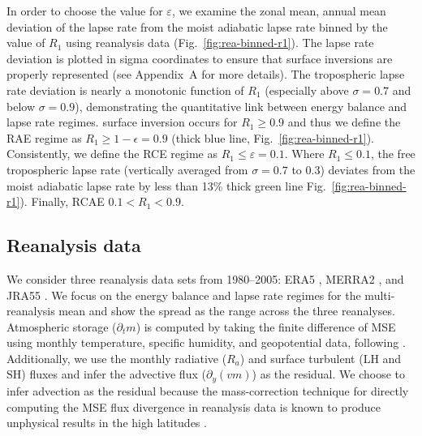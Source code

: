 \documentclass{ametsocV5}
\begin{document}
    In order to choose the value for $\varepsilon$, we examine the zonal mean, annual mean deviation of the lapse rate from the moist adiabatic lapse rate binned by the value of $R_1$ using reanalysis data (Fig.~\ref{fig:rea-binned-r1}). The lapse rate deviation is plotted in sigma coordinates to ensure that surface inversions are properly represented (see Appendix~A for more details). The tropospheric lapse rate deviation is nearly a monotonic function of $R_1$ (especially above $\sigma=0.7$ and below $\sigma=0.9$), demonstrating the quantitative link between energy balance and lapse rate regimes.  surface inversion occurs for $R_1 \ge 0.9$ and thus we define the RAE regime as $R_1\ge1-\epsilon=0.9$ (thick blue line, Fig.~\ref{fig:rea-binned-r1}). Consistently, we define the RCE regime as $R_1\le\varepsilon=0.1$. Where $R_1\le 0.1$, the free tropospheric lapse rate (vertically averaged from $\sigma=0.7$ to 0.3) deviates from the moist adiabatic lapse rate by less than 13\% thick green line Fig.~\ref{fig:rea-binned-r1}). Finally, RCAE $0.1<R_1<0.9$.

    \subsection{Reanalysis data}\label{subsec:reanalysis}
    We consider three reanalysis data sets from 1980--2005: ERA5 \citep{hersbach2020}, MERRA2 \citep{gelaro2017}, and JRA55 \citep{kobayashi2015}. We focus on the energy balance and lapse rate regimes for the multi-reanalysis mean and show the spread as the range across the three reanalyses. Atmospheric storage ($\partial_t m$) is computed by taking the finite difference of MSE using monthly temperature, specific humidity, and geopotential data, following \cite{donohoe2013}. Additionally, we use the monthly radiative ($R_a$) and surface turbulent ($\mathrm{LH}$ and $\mathrm{SH}$) fluxes and infer the advective flux ($\partial_y (vm)$) as the residual. We choose to infer advection as the residual because the mass-correction technique for directly computing the MSE flux divergence in reanalysis data is known to produce unphysical results in the high latitudes \citep{porter2010}. 
\end{document}
